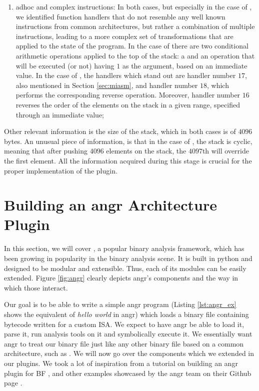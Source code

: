 \begin{enumerate}
    \item adhoc and complex instructions: In both cases, but especially in the case of , we identified function handlers that do not resemble any well known instructions from common architectures, but rather a combination of multiple instructions, leading to a more complex set of transformations that are applied to the state of the program. In the case of  there are two conditional arithmetic operations applied to the top of the stack: a  and an  operation that will be executed (or not) having $1$ as the argument, based on an immediate value. In the case of , the handlers which stand out are handler number $17$, also mentioned in Section \ref{sec:miasm}, and handler number $18$, which performs the corresponding reverse operation. Moreover, handler number $16$ reverses the order of the elements on the stack in a given range, specified through an immediate value;
\end{enumerate} 

Other relevant information is the size of the stack, which in both cases is of $4096$ bytes. An unusual piece of information, is that in the case of , the stack is cyclic, meaning that after pushing $4096$ elements on the stack, the $4097$th will override the first element. All the information acquired during this stage is crucial for the proper implementation of the  plugin.

\section{Building an angr Architecture Plugin}

In this section, we will cover  \cite{angr}, a popular binary analysis framework, which has been growing in popularity in the binary analysis scene. It is built in python and designed to be modular and extensible. Thus, each of its modules can be easily extended. Figure \ref{fig:angr} clearly depicts angr's components and the way in which those interact. 

Our goal is to be able to write a simple angr program (Listing \ref{lst:angr_ex} shows the equivalent of \emph{hello world} in angr) which loads a binary file containing bytecode written for a custom \gls{ISA}. We expect to have angr be able to load it, parse it, run analysis tools on it and symbolically execute it. We essentially want angr to treat our binary file just like any other binary file based on a common architecture, such as . We will now go over the components which we extended in our plugins. We took a lot of inspiration from a tutorial on building an angr plugin for \gls{BF} \cite{brainfk}, and other examples showcased by the angr team on their Github page \cite{angr_tut}.

